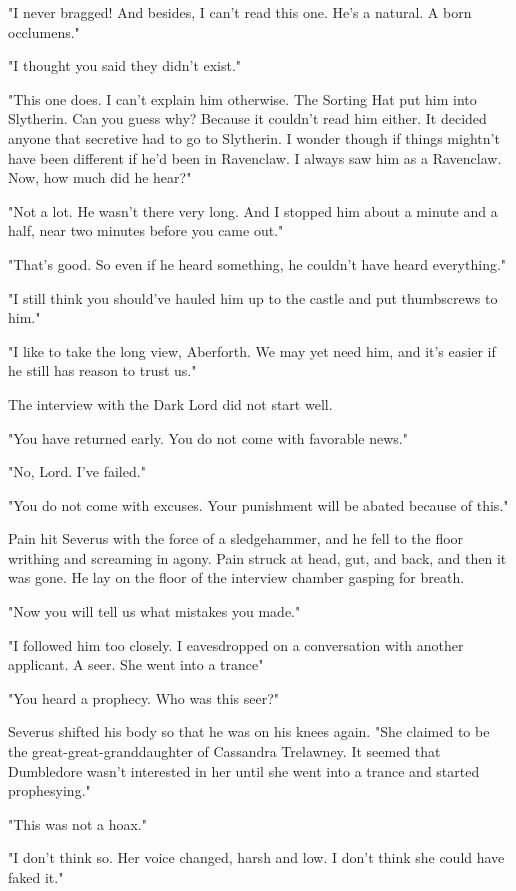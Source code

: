 "I never bragged! And besides, I can't read this one. He's a natural. A born occlumens."

"I thought you said they didn't exist."

"This one does. I can't explain him otherwise. The Sorting Hat put him into Slytherin. Can you guess why? Because it couldn't read him either. It decided anyone that secretive had to go to Slytherin. I wonder though if things mightn't have been different if he'd been in Ravenclaw. I always saw him as a Ravenclaw. Now, how much did he hear?"

"Not a lot. He wasn't there very long. And I stopped him about a minute and a half, near two minutes before you came out."

"That's good. So even if he heard something, he couldn't have heard everything."

"I still think you should've hauled him up to the castle and put thumbscrews to him."

"I like to take the long view, Aberforth. We may yet need him, and it's easier if he still has reason to trust us."

The interview with the Dark Lord did not start well.

"You have returned early. You do not come with favorable news."

"No, Lord. I've failed."

"You do not come with excuses. Your punishment will be abated because of this."

Pain hit Severus with the force of a sledgehammer, and he fell to the floor writhing and screaming in agony. Pain struck at head, gut, and back, and then it was gone. He lay on the floor of the interview chamber gasping for breath.

"Now you will tell us what mistakes you made."

"I followed him too closely. I eavesdropped on a conversation with another applicant. A seer. She went into a trance{\el}"

"You heard a prophecy. Who was this seer?"

Severus shifted his body so that he was on his knees again. "She claimed to be the great-great-granddaughter of Cassandra Trelawney. It seemed that Dumbledore wasn't interested in her until she went into a trance and started prophesying."

"This was not a hoax."

"I don't think so. Her voice changed, harsh and low. I don't think she could have faked it."

